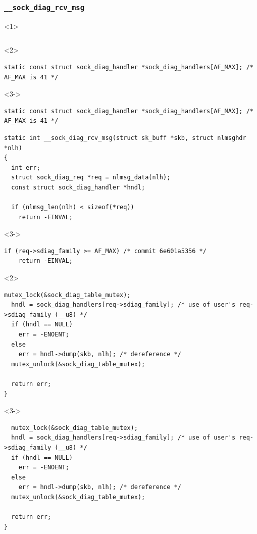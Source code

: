 \documentclass[xcolor=dvipsnames]{beamer}
\newcommand{\code}[2][]{\lstinline[columns=fullflexible, basicstyle=\ttfamily,
	#1]$#2$}
\begin{document}
\begin{frame}[fragile]
  \frametitle{\code{__sock_diag_rcv_msg}}

\begin{onlyenv}<1>
\begin{lstlisting}[showlines]

\end{lstlisting}
\end{onlyenv}
\begin{onlyenv}<2>
\begin{lstlisting}[backgroundcolor=\color{mygray}]
static const struct sock_diag_handler *sock_diag_handlers[AF_MAX]; /* AF_MAX is 41 */
\end{lstlisting}
\end{onlyenv}
\begin{onlyenv}<3->
\begin{lstlisting}
static const struct sock_diag_handler *sock_diag_handlers[AF_MAX]; /* AF_MAX is 41 */
\end{lstlisting}
\end{onlyenv}
\begin{lstlisting}
static int __sock_diag_rcv_msg(struct sk_buff *skb, struct nlmsghdr *nlh)
{
  int err;
  struct sock_diag_req *req = nlmsg_data(nlh);
  const struct sock_diag_handler *hndl;

  if (nlmsg_len(nlh) < sizeof(*req))
    return -EINVAL;
\end{lstlisting}
\begin{uncoverenv}<3->
\begin{lstlisting}[backgroundcolor=\color{mygray}]
  if (req->sdiag_family >= AF_MAX) /* commit 6e601a5356 */
    return -EINVAL;
\end{lstlisting}
\end{uncoverenv}
\begin{onlyenv}<2>
\begin{lstlisting}[backgroundcolor=\color{mygray}]
  mutex_lock(&sock_diag_table_mutex);
  hndl = sock_diag_handlers[req->sdiag_family]; /* use of user's req->sdiag_family (__u8) */
  if (hndl == NULL)
    err = -ENOENT;
  else
    err = hndl->dump(skb, nlh); /* dereference */
  mutex_unlock(&sock_diag_table_mutex);

  return err;
}
\end{lstlisting}
\end{onlyenv}
\begin{uncoverenv}<3->
\begin{lstlisting}
  mutex_lock(&sock_diag_table_mutex);
  hndl = sock_diag_handlers[req->sdiag_family]; /* use of user's req->sdiag_family (__u8) */
  if (hndl == NULL)
    err = -ENOENT;
  else
    err = hndl->dump(skb, nlh); /* dereference */
  mutex_unlock(&sock_diag_table_mutex);

  return err;
}
\end{lstlisting}
\end{uncoverenv}

\end{frame}
\end{document}
